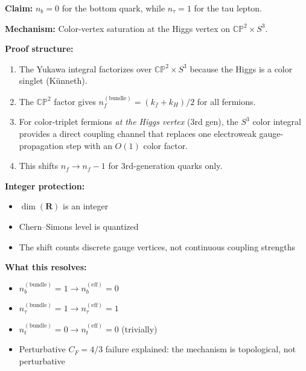 \documentclass[11pt,a4paper]{article}
\newcommand{\CP}{\mathbb{CP}}
\theoremstyle{definition}
\theoremstyle{remark}
\begin{document}
\begin{tcolorbox}[colback=green!5!white, colframe=green!60!black,
title={RESOLVED: The $b$-quark exponent tension}]

\textbf{Claim:} $n_b = 0$ for the bottom quark, while $n_\tau = 1$
for the tau lepton.

\textbf{Mechanism:} Color-vertex saturation at the Higgs vertex on
$\CP^2 \times S^3$.

\textbf{Proof structure:}
\begin{enumerate}
\item The Yukawa integral factorizes over $\CP^2 \times S^3$ because
the Higgs is a color singlet (K\"unneth).
\item The $\CP^2$ factor gives $n_f^{(\text{bundle})} = (k_f+k_H)/2$
for all fermions.
\item For color-triplet fermions \emph{at the Higgs vertex} (3rd gen),
the $S^3$ color integral provides a direct coupling channel that
replaces one electroweak gauge-propagation step with an $O(1)$ color
factor.
\item This shifts $n_f \to n_f - 1$ for 3rd-generation quarks only.
\end{enumerate}

\textbf{Integer protection:}
\begin{itemize}
\item $\dim(\mathbf{R})$ is an integer
\item Chern--Simons level is quantized
\item The shift counts discrete gauge vertices, not continuous coupling
strengths
\end{itemize}

\textbf{What this resolves:}
\begin{itemize}
\item $n_b^{(\text{bundle})} = 1 \to n_b^{(\text{eff})} = 0$
\checkmark
\item $n_\tau^{(\text{bundle})} = 1 \to n_\tau^{(\text{eff})} = 1$
\checkmark
\item $n_t^{(\text{bundle})} = 0 \to n_t^{(\text{eff})} = 0$
\checkmark (trivially)
\item Perturbative $C_F = 4/3$ failure explained: the mechanism is
topological, not perturbative
\end{itemize}
\end{tcolorbox}
\end{document}
